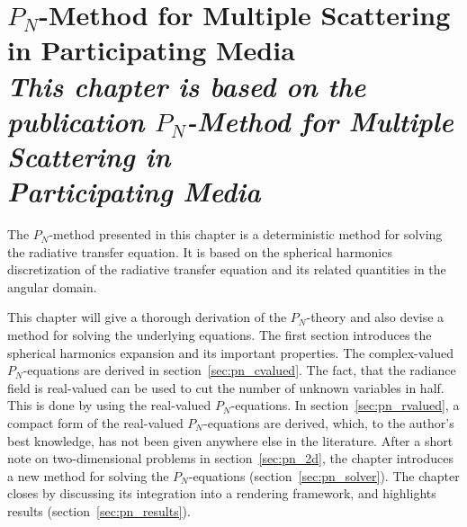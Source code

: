 \chapter[$P_N$-Method for Multiple Scattering in Participating Media]{$P_N$-Method for Multiple Scattering in Participating Media\\[15pt]\normalsize\itshape This chapter is based on the publication $P_N$-Method for Multiple Scattering in\\[-13pt] Participating Media~\cite{Koerner18}}
\label{sec:pnmethod}

The $P_N$-method presented in this chapter is a deterministic method for solving the radiative transfer equation. It is based on the spherical harmonics discretization of the radiative transfer equation and its related quantities in the angular domain. 

This chapter will give a thorough derivation of the $P_N$-theory and also devise a method for solving the underlying equations. The first section introduces the spherical harmonics expansion and its important properties. The complex-valued $P_N$-equations are derived in section~\ref{sec:pn_cvalued}. The fact, that the radiance field is real-valued can be used to cut the number of unknown variables in half. This is done by using the real-valued $P_N$-equations. In section~\ref{sec:pn_rvalued}, a compact form of the real-valued $P_N$-equations are derived, which, to the author's best knowledge, has not been given anywhere else in the literature. After a short note on two-dimensional problems in section~\ref{sec:pn_2d}, the chapter introduces a new method for solving the $P_N$-equations (section~\ref{sec:pn_solver}). The chapter closes by discussing its integration into a rendering framework, and highlights results (section~\ref{sec:pn_results}).








